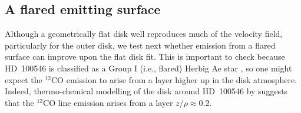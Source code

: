 \documentclass[onecolumn]{aastex6}
\begin{document}
% 

\subsection{A flared emitting surface}

Although a geometrically flat disk well reproduces much of  the velocity field,
particularly for the outer disk,  we test next whether emission from a flared
surface can improve upon the flat disk fit.   This is important to check because
HD~100546 is classified as a Group I (i.e., flared)  Herbig Ae star
\citep{meeus01}, so one might expect the $^{12}$CO emission to arise from a
layer  higher up in the disk atmosphere.   Indeed, thermo-chemical modelling of
the disk around HD~100546 by \citet{bruderer12}  suggests that the $^{12}$CO
line emission arises from a layer $z/\rho \approx 0.2$. 
\end{document}
